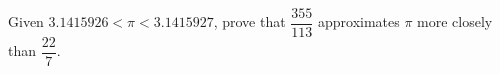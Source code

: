 Given $3.1415926<\pi<3.1415927$, prove that $\dfrac{355}{113}$ approximates $\pi$ more closely than $\dfrac{22}{7}$.

